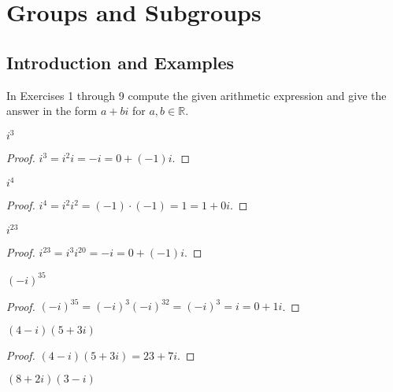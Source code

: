 \chapter{Groups and Subgroups}

\section{Introduction and Examples}
\setcounter{exercise}{0}

In Exercises 1 through 9 compute the given arithmetic expression and give the answer in the form $a + bi$ for $a, b\in \mathbb{R}$.

\begin{exercise}
    $i^{3}$
\end{exercise}

\begin{proof}
    $i^{3} = {i}^{2}i = -i = 0 + (-1)i$.
\end{proof}

\begin{exercise}
    $i^{4}$
\end{exercise}

\begin{proof}
    $i^{4} = {i}^{2}{i}^{2} = (-1)\cdot (-1) = 1 = 1 + 0i$.
\end{proof}

\begin{exercise}
    $i^{23}$
\end{exercise}

\begin{proof}
    $i^{23} = {i}^{3}{i}^{20} = -i = 0 + (-1)i$.
\end{proof}

\begin{exercise}
    ${(-i)}^{35}$
\end{exercise}

\begin{proof}
    ${(-i)}^{35} = {(-i)}^{3}{(-i)}^{32} = {(-i)}^{3} = i = 0 + 1i$.
\end{proof}

\begin{exercise}
    $(4 - i)(5 + 3i)$
\end{exercise}

\begin{proof}
    $(4 - i)(5 + 3i) = 23 + 7i$.
\end{proof}

\begin{exercise}
    $(8 + 2i)(3 - i)$
\end{exercise}

